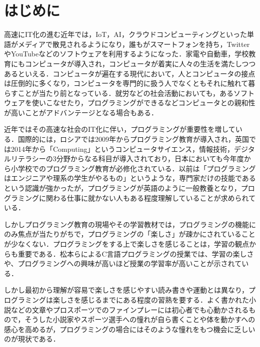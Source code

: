 \section{はじめに}

高速にIT化の進む近年では，IoT，AI，クラウドコンピューティングといった単語がメディアで散見されるようになり，誰もがスマートフォンを持ち，TwitterやYouTubeなどのソフトウェアを利用するようになった．家電や自動車，学校教育にもコンピュータが導入され，コンピュータが着実に人々の生活を満たしつつあるといえる．コンピュータが遍在する現代において，人とコンピュータの接点は圧倒的に多くなり，コンピュータを専門的に扱う人でなくともそれに触れて暮らすことが当たり前となっている．就労などの社会活動においても，あるソフトウェアを使いこなせたり，プログラミングができるなどコンピュータとの親和性が高いことがアドバンテージとなる場合もある．

近年ではその高速な社会のIT化に伴い，プログラミングが重要性を増している．国際的には，ロシアでは2009年からプログラミング教育が導入され，英国では2014年から「Computing」というコンピュータサイエンス，情報技術，デジタルリテラシーの3分野からなる科目が導入されており\cite{survey}，日本においても今年度から小学校でのプログラミング教育が必修化されている\cite{guide}．以前は「プログラミングはエンジニアや理系の学生がやるもの」というような，専門家だけの技能であるという認識が強かったが，プログラミングが英語のように一般教養となり，プログラミングに関わる仕事に就かない人もある程度理解していることが求められている．


しかしプログラミング教育の現場やその学習教材では，プログラミングの機能にのみ焦点が当たりがちで，プログラミングの「楽しさ」が疎かにされていることが少なくない．プログラミングをする上で楽しさを感じることは，学習の観点からも重要である．松本らによるC言語プログラミングの授業では、学習の楽しさや、プログラミングへの興味が高いほど授業の学習率が高いことが示されている\cite{matsumoto}．

しかし最初から理解が容易で楽しさを感じやすい読み書きや運動とは異なり，プログラミングは楽しさを感じるまでにある程度の習熟を要する．よく書かれた小説などの文章やプロスポーツでのファインプレーには初心者でも心動かされるもので，そうした小説家やスポーツ選手への憧れが自ら書くことや体を動かすへの感心を高めるが，プログラミングの場合にはそのような憧れをもつ機会に乏しいのが現状である．

